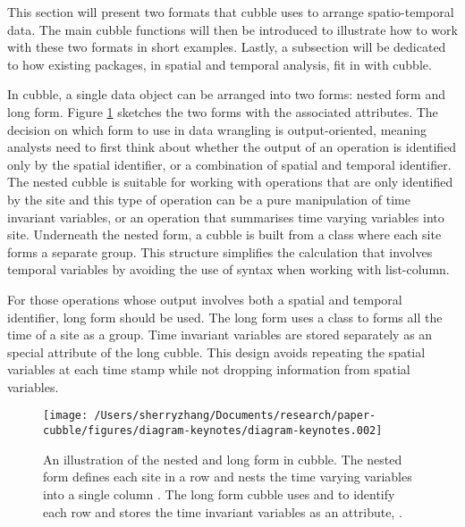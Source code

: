 \documentclass[
]{jss}
\begin{document}
This section will present two formats that cubble uses to arrange
spatio-temporal data. The main cubble functions will then be introduced
to illustrate how to work with these two formats in short examples.
Lastly, a subsection will be dedicated to how existing packages, in
spatial and temporal analysis, fit in with cubble.

In cubble, a single data object can be arranged into two forms: nested
form and long form. Figure \ref{fig:illu-cubble} sketches the two forms
with the associated attributes. The decision on which form to use in
data wrangling is output-oriented, meaning analysts need to first think
about whether the output of an operation is identified only by the
spatial identifier, or a combination of spatial and temporal identifier.
The nested cubble is suitable for working with operations that are only
identified by the site and this type of operation can be a pure
manipulation of time invariant variables, or an operation that
summarises time varying variables into site. Underneath the nested form,
a cubble is built from a  class where each site forms a
separate group. This structure simplifies the calculation that involves
temporal variables by avoiding the use of  syntax
when working with list-column.

For those operations whose output involves both a spatial and temporal
identifier, long form should be used. The long form uses a
 class to forms all the time of a site as a group. Time
invariant variables are stored separately as an special attribute of the
long cubble. This design avoids repeating the spatial variables at each
time stamp while not dropping information from spatial variables.

\begin{CodeChunk}
\begin{figure}

{\centering \texttt{[image: /Users/sherryzhang/Documents/research/paper-cubble/figures/diagram-keynotes/diagram-keynotes.002]} 

}

\caption{An illustration of the nested and long form in cubble. The nested form defines each site in a row and nests the time varying variables into a single column . The long form cubble uses  and  to identify each row and stores the time invariant variables as an attribute, .}\label{fig:illu-cubble}
\end{figure}
\end{CodeChunk}
\end{document}

